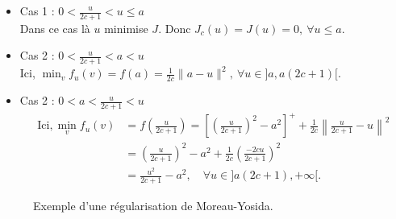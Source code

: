 \documentclass[main.tex]{subfiles}
\begin{document}
\begin{itemize}
\renewcommand{\labelitemi}{\scriptsize$\bullet$} 
\item Cas 1 : $0 < \frac{u}{2c+1} < u \leq a$\\ %
Dans ce cas là $u$ minimise $J$. Donc $J_c(u)=J(u)=0, \ \forall u \leq a$.

\item Cas 2 : $0 < \frac{u}{2c+1} < a < u \qquad$ 
\\
Ici, $\min_v f_u(v) = f(a) = \frac{1}{2c} \| a-u\|^2, \ \forall u \in ]a,a(2c+1)[.$
\item Cas 2 : $0 < a < \frac{u}{2c+1} < u \qquad$ 
\\
\begin{align*}
\textrm{Ici}, \min_v f_u(v) &= f\left( \frac{u}{2c+1} \right) = \left[ \left( \frac{u}{2c+1} \right)^2 -a^2 \right]^+ + \frac{1}{2c} \left\| \frac{u}{2c+1}-u \right\|^2 \\
& = \left( \frac{u}{2c+1} \right)^2 -a^2 + \frac{1}{2c} \left( \frac{-2cu}{2c+1} \right)^2 \\
& = \frac{u^2}{2c+1} -a^2, \quad \forall u \in ]a(2c+1),+\infty[.
\end{align*}
\end{itemize}
\begin{figure}
\centering
{}
\caption{\label{fig:regul_yosida} Exemple d'une régularisation de Moreau-Yosida.}
\end{figure}
\end{document}
